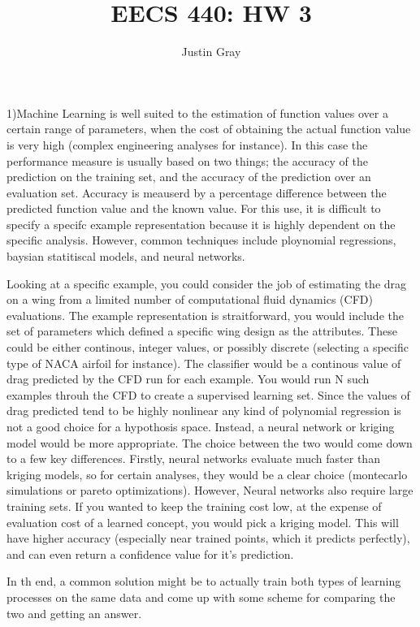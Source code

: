 \documentclass[12pt]{article}
\title{EECS 440: HW 3}
\author{Justin Gray}
\begin{document}
\maketitle

1)Machine Learning is well suited to the estimation of function values over a 
certain range of parameters, when the cost of obtaining the actual function value
is very high (complex engineering analyses for instance). In this case the performance
measure is usually based on two things; the accuracy of the prediction on the training 
set, and the accuracy of the prediction over an evaluation set. Accuracy is meauserd 
by a percentage difference between the predicted function value and the known value. 
For this use, it is difficult to specify a specifc example representation because it 
is highly dependent on the specific analysis. However, common techniques include 
ploynomial regressions, baysian statitiscal models, and neural networks. 

Looking at a specific example, you could consider the job of estimating the drag on a wing
from a limited number of computational fluid dynamics (CFD) evaluations. The example 
representation is straitforward, you would include the set of parameters which defined
a specific wing design as the attributes. These could be either continous, integer values, 
or possibly discrete (selecting a specific type of NACA airfoil for instance). The 
classifier would be a continous value of drag predicted by the CFD run for each example. 
You would run N such examples throuh the CFD to create a supervised learning set. 
Since the values of drag predicted tend to be highly nonlinear any kind of polynomial 
regression is not a good choice for a hypothosis space. Instead, a neural network or 
kriging model would be more appropriate. The choice between the two would come down to a
few key differences. Firstly, neural networks evaluate much faster than kriging models, 
so for certain analyses, they would be a clear choice (montecarlo simulations or 
pareto optimizations). However, Neural networks also require large training sets. If you
wanted to keep the training cost low, at the expense of evaluation cost of a learned concept, 
you would pick a kriging model. This will have higher accuracy (especially near trained points, 
which it predicts perfectly), and can even return a confidence value for it's prediction. 

In th end, a common solution might be to actually train both types of learning processes
on the same data and come up with some scheme for comparing the two and getting an answer. 
\end{document}
